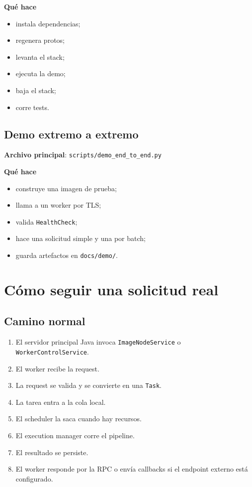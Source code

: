 \documentclass[11pt]{article}
\begin{document}
\textbf{Qué hace}
\begin{itemize}
\item instala dependencias;
\item regenera protos;
\item levanta el stack;
\item ejecuta la demo;
\item baja el stack;
\item corre tests.
\end{itemize}

\subsection{Demo extremo a extremo}
\textbf{Archivo principal}: \texttt{scripts/demo\_end\_to\_end.py}

\textbf{Qué hace}
\begin{itemize}
\item construye una imagen de prueba;
\item llama a un worker por TLS;
\item valida \texttt{HealthCheck};
\item hace una solicitud simple y una por batch;
\item guarda artefactos en \texttt{docs/demo/}.
\end{itemize}

\section{Cómo seguir una solicitud real}

\subsection{Camino normal}
\begin{enumerate}
\item El servidor principal Java invoca \texttt{ImageNodeService} o \texttt{WorkerControlService}.
\item El worker recibe la request.
\item La request se valida y se convierte en una \texttt{Task}.
\item La tarea entra a la cola local.
\item El scheduler la saca cuando hay recursos.
\item El execution manager corre el pipeline.
\item El resultado se persiste.
\item El worker responde por la RPC o envía callbacks si el endpoint externo está configurado.
\end{enumerate}
\end{document}
